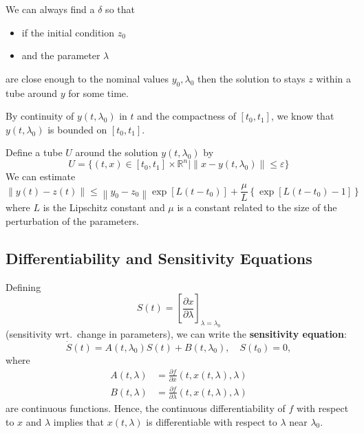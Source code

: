 \newpar{}

We can always find a $\delta$ so that
\begin{itemize}
    \item if the initial condition $z_0$
    \item and the parameter $\lambda$
\end{itemize}
are close enough to the nominal values $y_0, \lambda_0$ then the solution to stays $z$ within a tube around $y$ for some time.

\begin{examplesection}[Proof]

    By continuity of $y (t, \lambda_0)$ in $t$ and the compactness of $[t_0, t_1]$, we know that $y (t, \lambda_0)$ is bounded on $[t_0, t_1]$.

    \newpar{}

    Define a tube $U$ around the solution $y(t, \lambda_0)$ by
    \noindent\begin{equation*}
        U=\{(t,x)\in[t_0,t_1]\times\mathbb{R}^n|\left\|x-y\left(t,\lambda_0\right)\right\|\leq\varepsilon\}
    \end{equation*}
    We can estimate
        {\small
            \noindent\begin{equation*}
                \left\|y\left(t\right)-z\left(t\right)\right\|\leq\left\|y_0-z_0\right\|\exp\left[L\left(t-t_0\right)\right]+\frac{\mu}{L}\left\{\exp\left[L\left(t-t_0\right)-1\right]\right\}
            \end{equation*}
        }
    where $L$ is the Lipschitz constant and $\mu$ is a constant related to the size of the perturbation of the parameters.
\end{examplesection}


\subsection{Differentiability and Sensitivity Equations}

Defining
\noindent\begin{equation*}
    S(t) = {\left[\frac{\partial x}{\partial \lambda}\right]}_{\lambda = \lambda_0}
\end{equation*}
(sensitivity wrt.\ change in parameters), we can write the \textbf{sensitivity equation}:
\noindent\begin{equation*}
    \dot{S} (t) = A (t, \lambda_0) S (t) + B (t, \lambda_0), \quad S (t_0) = 0,
\end{equation*}
where
\noindent\begin{align*}
    A\left(t,\lambda\right) & = \frac{\partial f}{\partial x}\left(t,x\left(t,\lambda\right),\lambda\right)      \\
    B\left(t,\lambda\right) & = \frac{\partial f}{\partial\lambda}\left(t,x\left(t,\lambda\right),\lambda\right)
\end{align*}
are continuous functions. Hence, the continuous differentiability of $f$ with respect to $x$ and $\lambda$ implies that $x(t, \lambda)$ is differentiable with respect to $\lambda$ near $\lambda_0$.

